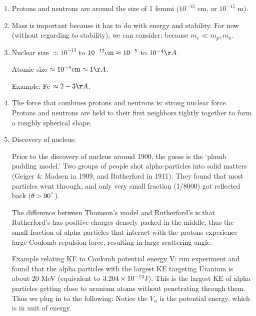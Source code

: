 \documentclass{school-22.101-notes}
\begin{document}
\begin{enumerate}
\item Protons and neutrons are around the size of 1 femmi ($10^{-13}$ cm, or $10^{-15}$ m). 

\item Mass is important because it has to do with energy and stability. For now (without regarding to stability), we can consider: 
because $m_e \ll m_p, m_n$. 

\item Nuclear size $\approx 10^{-13}$ to $10^{-12} \mathrm{cm} \approx 10^{-5}$ to $10^{-4} \AA$. 

Atomic size $\approx 10^{-8} \cm \approx 1 \AA$. 

Example: Fe $\approx 2-3 \AA$. 

\item The force that combines protons and neutrons is: strong nuclear force. Protons and neutrons are held to their first neighbors tightly together to form a roughly spherical shape. 

\item Discovery of nucleus: 

Prior to the discovery of nucleus around 1900, the guess is the `plumb pudding model.' Two groups of people shot alpha-particles into solid matters (Geiger \& Madsen in 1909, and Rutherford in 1911). They found that most particles went through, and only very small fraction (1/8000) got reflected back ($\theta > 90^{^{\circ}}$). 

The difference between Thomson's model and Rutherford's is that Rutherford's has positive charges densely packed in the middle, thus the small fraction of alpha particles that interact with the protons experience large Coulomb repulsion force, resulting in large scattering angle. 

Example relating KE to Coulomb potential energy V: run experiment and found that the alpha particles with the largest KE targeting Uranium is about 20 MeV (equivalent to $3.204 \times 10^{-12} \mathrm{J}$). This is the largest KE of alpha particles getting close to uranium atoms without penetrating through them. Thus we plug in to the following: 
Notice the $V_\alpha$ is the potential energy, which is in unit of energy. 



\end{enumerate}
\end{document}
